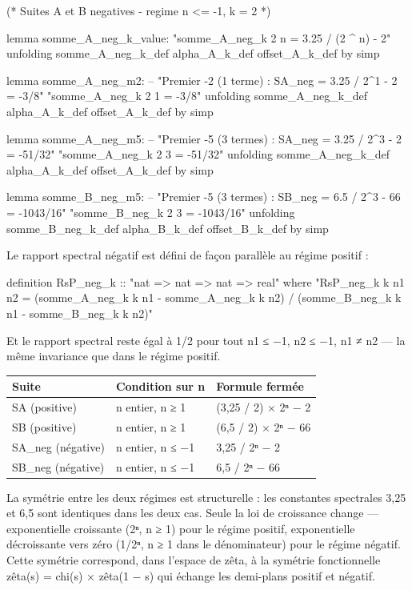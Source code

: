\documentclass[11pt,a4paper]{article}
\begin{document}
\begin{holcode}[title={Code HOL — Régime négatif (n ≤ −1, k = 2)}]
(* Suites A et B negatives - regime n <= -1, k = 2 *)

lemma somme_A_neg_k_value:
 "somme_A_neg_k 2 n = 3.25 / (2 \textasciicircum{} n) - 2"
 unfolding somme_A_neg_k_def alpha_A_k_def offset_A_k_def by simp

lemma somme_A_neg_m2:
 -- "Premier -2 (1 terme) : SA_neg = 3.25 / 2^1 - 2 = -3/8"
 "somme_A_neg_k 2 1 = -3/8"
 unfolding somme_A_neg_k_def alpha_A_k_def offset_A_k_def by simp

lemma somme_A_neg_m5:
 -- "Premier -5 (3 termes) : SA_neg = 3.25 / 2^3 - 2 = -51/32"
 "somme_A_neg_k 2 3 = -51/32"
 unfolding somme_A_neg_k_def alpha_A_k_def offset_A_k_def by simp

lemma somme_B_neg_m5:
 -- "Premier -5 (3 termes) : SB_neg = 6.5 / 2^3 - 66 = -1043/16"
 "somme_B_neg_k 2 3 = -1043/16"
 unfolding somme_B_neg_k_def alpha_B_k_def offset_B_k_def by simp
\end{holcode}

Le rapport spectral négatif est défini de façon parallèle au régime positif :

\begin{holcode}[title={Code HOL — Définition de RsP négatif}]
definition RsP_neg_k :: "nat => nat => nat => real" where
 "RsP_neg_k k n1 n2 =
 (somme_A_neg_k k n1 - somme_A_neg_k k n2) /
 (somme_B_neg_k k n1 - somme_B_neg_k k n2)"
\end{holcode}

Et le rapport spectral reste égal à 1/2 pour tout n1 ≤ −1, n2 ≤ −1, n1 ≠ n2 — la même invariance que dans le régime positif.


\begin{longtable}{|p{}|p{}|p{}|}
\hline
Suite & Condition sur n & Formule fermée \\
\hline
SA (positive) & n entier, n ≥ 1 & (3,25 / 2) × 2ⁿ − 2 \\
\hline
SB (positive) & n entier, n ≥ 1 & (6,5 / 2) × 2ⁿ − 66 \\
\hline
SA\_neg (négative) & n entier, n ≤ −1 & 3,25 / 2ⁿ − 2 \\
\hline
SB\_neg (négative) & n entier, n ≤ −1 & 6,5 / 2ⁿ − 66 \\
\hline
\end{longtable}


La symétrie entre les deux régimes est structurelle : les constantes spectrales 3,25 et 6,5 sont identiques dans les deux cas. Seule la loi de croissance change — exponentielle croissante (2ⁿ, n ≥ 1) pour le régime positif, exponentielle décroissante vers zéro (1/2ⁿ, n ≥ 1 dans le dénominateur) pour le régime négatif. Cette symétrie correspond, dans l'espace de zêta, à la symétrie fonctionnelle zêta(s) = chi(s) × zêta(1 − s) qui échange les demi-plans positif et négatif.
\end{document}
